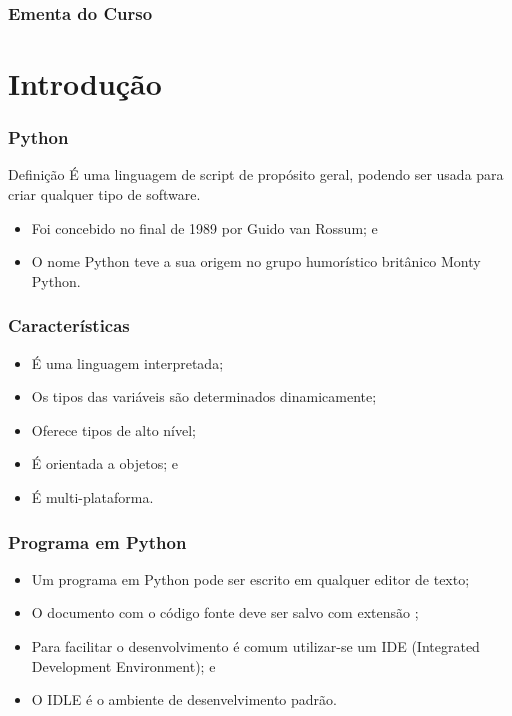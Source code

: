 \documentclass{beamer}
\begin{document}
\begin{frame}
	\frametitle{Ementa do Curso}
  	\tableofcontents
\end{frame}


\section{Introdução}

\begin{frame}
	\frametitle{Python}

	\begin{block}{Definição}
		É uma linguagem de script de propósito geral, podendo ser usada para criar
		qualquer tipo de software.
	\end{block}\vfill
	
	\begin{itemize}
		\item Foi concebido no final de 1989 por Guido van Rossum; e
		\item O nome Python teve a sua origem no grupo humorístico britânico
		Monty Python.
	\end{itemize}
\end{frame}

\begin{frame}
\frametitle{Características}

\begin{itemize}
	\item É uma linguagem interpretada;
	\item Os tipos das variáveis são determinados dinamicamente;
	\item Oferece tipos de alto nível;
	\item É orientada a objetos; e
	\item É multi-plataforma.
\end{itemize}
\end{frame}

\begin{frame}
\frametitle{Programa em Python}

\begin{itemize}
	\item Um programa em Python pode ser escrito em qualquer editor de texto;
	\item O documento com o código fonte deve ser salvo com extensão ;
	\item Para facilitar o desenvolvimento é comum utilizar-se um IDE
	(Integrated Development Environment); e
	\item O IDLE é o ambiente de desenvelvimento padrão.
\end{itemize}
\end{frame}
\end{document}

